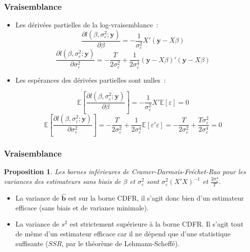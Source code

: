 \documentclass[10pt]{beamer}
\theoremstyle{plain}
\newtheorem{prop}{Proposition}
\begin{document}
\begin{frame}
  \frametitle{Vraisemblance}

  \begin{itemize}

  \item Les dérivées partielles de la log-vraisemblance~:
    \[
      \frac{\partial l(\beta, \sigma_{\varepsilon}^2; \mathbf y)}{\partial\beta} = -\frac{1}{\sigma_{\varepsilon}^2}X'(\mathbf y - X\beta)
    \]
    \[
      \frac{\partial l(\beta, \sigma_{\varepsilon}^2; \mathbf y)}{\partial\sigma_{\varepsilon}^2} = -\frac{T}{2\sigma_{\varepsilon}^2} + \frac{1}{2\sigma_{\varepsilon}^4}\left( \mathbf y - X\beta \right)'\left( \mathbf y - X\beta \right)
    \]
    \medskip

  \item Les espérances des dérivées partielles sont nulles~:

    \[
      \mathbb E\left[ \frac{\partial l(\beta, \sigma_{\varepsilon}^2; \mathbf y)}{\partial\beta} \right] = -\frac{1}{\sigma_{\varepsilon}^2}X'\mathbb E[\varepsilon] = 0
    \]
    \[
      \mathbb E \left[ \frac{\partial l(\beta, \sigma_{\varepsilon}^2; \mathbf y)}{\partial\sigma_{\varepsilon}^2} \right] = -\frac{T}{2\sigma_{\varepsilon}^2} + \frac{1}{2\sigma_{\varepsilon}^4}\mathbb E[\varepsilon'\varepsilon] = -\frac{T}{2\sigma_{\varepsilon}^2} + \frac{T\sigma_{\varepsilon}^2}{2\sigma_{\varepsilon}^4} = 0
    \]

  \end{itemize}

\end{frame}


\begin{frame}
  \frametitle{Vraisemblance}

  \begin{prop}\label{prop:cdfr}
    Les bornes inférieures de Cramer-Darmois-Fréchet-Rao pour les variances des estimateurs sans biais de $\beta$ et $\sigma_{\varepsilon}^2$ sont $\sigma_{\varepsilon}^2(X'X)^{-1}$ et $\frac{2\sigma_{\varepsilon}^4}{T}$.
  \end{prop}

  \bigskip

  \begin{itemize}

  \item La variance de $\hat{\mathbf b}$ est sur la borne CDFR, il s'agit donc bien d'un estimateur efficace (sans biais et de variance minimale).\newline

  \item La variance de $s^2$ est strictement supérieure à la borne CDFR. Il s'agit tout de même d'un estimateur efficace car il ne dépend que d'une statistique suffisante ($SSR$, par le théorème de Lehmann-Scheffé).

  \end{itemize}

\end{frame}
\end{document}
